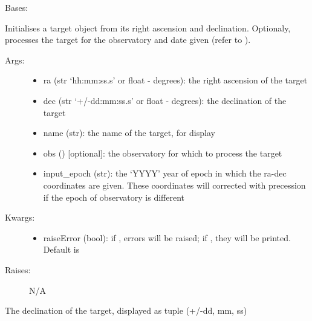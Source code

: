 \documentclass[letterpaper,10pt,english]{sphinxmanual}
\begin{document}

\begin{fulllineitems}
\label{astroobs:astroobs.Target}
Bases: 

Initialises a target object from its right ascension and declination. Optionaly, processes the target for the observatory and date given (refer to ).
\begin{description}
\item[{Args:}] \leavevmode\begin{itemize}
\item {} 
ra (str `hh:mm:ss.s' or float - degrees): the right ascension of the target

\item {} 
dec (str `+/-dd:mm:ss.s' or float - degrees): the declination of the target

\item {} 
name (str): the name of the target, for display

\item {} 
obs () {[}optional{]}: the observatory for which to process the target

\item {} 
input\_epoch (str): the `YYYY' year of epoch in which the ra-dec coordinates are given. These coordinates will corrected with precession if the epoch of observatory is different

\end{itemize}

\item[{Kwargs:}] \leavevmode\begin{itemize}
\item {} 
raiseError (bool): if , errors will be raised; if , they will be printed. Default is 

\end{itemize}

\item[{Raises:}] \leavevmode
N/A

\end{description}

\begin{fulllineitems}
\label{astroobs:astroobs.Target.dec}
The declination of the target, displayed as tuple (+/-dd, mm, ss)


\end{fulllineitems}
\end{fulllineitems}
\end{document}
